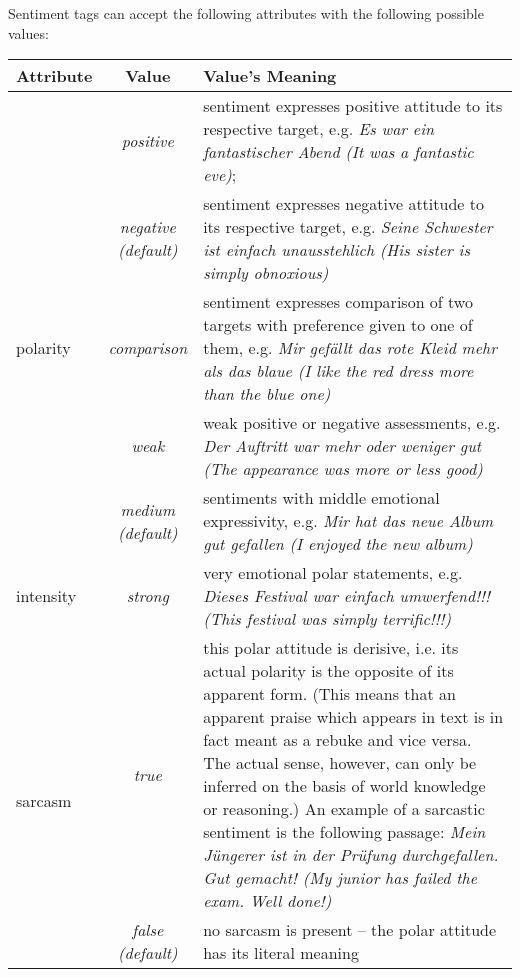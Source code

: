 \documentclass[11pt,a4paper]{article}
\newlength\clmnwidth
\begin{document}
Sentiment tags can accept the following attributes with the following
possible values:
\begin{center}
  \begin{tabular}[t]{|l|c|p{\clmnwidth}|}\hline
    Attribute & Value & Value's Meaning\\\hline

    & \textit{positive} & sentiment
    expresses positive attitude to its respective target,
    e.g. \textit{Es war ein fantastischer Abend (It was a fantastic
      eve)};\\\cline{2-3}

    & \textit{negative\newline(default)} & sentiment expresses
    negative attitude to its respective target, e.g. \textit{Seine
      Schwester ist einfach unausstehlich (His sister is simply
      obnoxious)}\\\cline{2-3}

    \multirow{-3}{*}{polarity} & \textit{comparison} & sentiment
    expresses comparison of two targets with preference given to one
    of them, e.g. \textit{Mir gef\"allt das rote Kleid mehr als das
      blaue (I like the red dress more than the blue one)}\\\hline


    & \textit{weak} & weak positive or
    negative assessments, e.g. \textit{Der Auftritt war mehr oder
      weniger gut (The appearance was more or less good)}\\\cline{2-3}

    & \textit{medium\newline(default)} & sentiments with middle
    emotional expressivity, e.g. \textit{Mir hat das neue Album gut
      gefallen (I enjoyed the new album)}\\\cline{2-3}

    \multirow{-3}{*}{intensity} & \textit{strong} & very emotional
    polar statements, e.g. \textit{Dieses Festival war einfach
      umwerfend!!! (This festival was simply terrific!!!)}\\\hline

    \multirow{2}{*}{sarcasm} & \textit{true} & this polar attitude is
    derisive, i.e. its actual polarity is the opposite of its apparent
    form. (This means that an apparent praise which appears in text is
    in fact meant as a rebuke and vice versa. The actual sense,
    however, can only be inferred on the basis of world knowledge or
    reasoning.)  An example of a sarcastic sentiment is the following
    passage: \textit{Mein J\"ungerer ist in der Pr\"ufung
      durchgefallen.  Gut gemacht! (My junior has failed the exam.
      Well done!)}\\\cline{2-3}

    & \textit{false\newline(default)} & no sarcasm is present -- the
    polar attitude has its literal meaning\\\hline
  \end{tabular}
\end{center}
\end{document}
